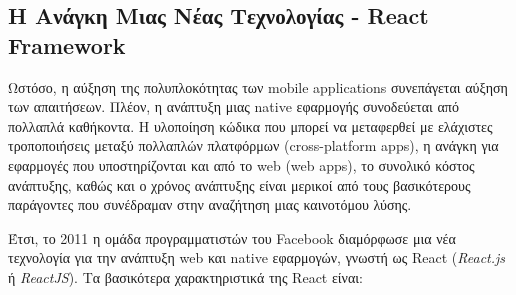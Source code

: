 \subsection{Η Ανάγκη Μιας Νέας Τεχνολογίας - React Framework}
Ωστόσο, η αύξηση της πολυπλοκότητας των mobile applications συνεπάγεται αύξηση των απαιτήσεων. Πλέον, η ανάπτυξη μιας native εφαρμογής συνοδεύεται από πολλαπλά καθήκοντα. H υλοποίηση κώδικα που μπορεί να μεταφερθεί με ελάχιστες τροποποιήσεις μεταξύ πολλαπλών πλατφόρμων (cross-platform apps), η ανάγκη για εφαρμογές που υποστηρίζονται και από το web (web apps), το συνολικό κόστος ανάπτυξης, καθώς και ο χρόνος ανάπτυξης είναι μερικοί από τους βασικότερους παράγοντες που συνέδραμαν στην αναζήτηση μιας καινοτόμου λύσης.

Έτσι, το 2011 η ομάδα προγραμματιστών του Facebook διαμόρφωσε μια νέα τεχνολογία για την ανάπτυξη web και native εφαρμογών, γνωστή ως React (\textit{React.js} ή \textit{ReactJS}). Τα βασικότερα χαρακτηριστικά της React είναι:

